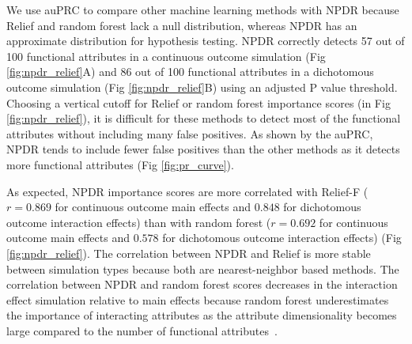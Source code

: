 \documentclass[10pt]{article}
\begin{document}
We use auPRC to compare other machine learning methods with NPDR because Relief and random forest lack a null distribution, whereas NPDR has an approximate distribution for hypothesis testing. NPDR correctly detects 57 out of 100 functional attributes in a continuous outcome simulation (Fig \ref{fig:npdr_relief}A) and 86 out of 100 functional attributes in a dichotomous outcome simulation (Fig \ref{fig:npdr_relief}B) using an adjusted P value threshold. Choosing a vertical cutoff for Relief or random forest importance scores (in Fig \ref{fig:npdr_relief}), it is difficult for these methods to detect most of the functional attributes without including many false positives. As shown by the auPRC, NPDR tends to include fewer false positives than the other methods as it detects more functional attributes (Fig \ref{fig:pr_curve}).

As expected, NPDR importance scores are more correlated with Relief-F ($r = 0.869$ for continuous outcome main effects and $0.848$ for dichotomous outcome interaction effects) than with random forest ($r = 0.692$ for continuous outcome main effects and $0.578$ for dichotomous outcome interaction effects) (Fig \ref{fig:npdr_relief}). The correlation between NPDR and Relief is more stable between simulation types because both are nearest-neighbor based methods. The correlation between NPDR and random forest scores decreases in the interaction effect simulation relative to main effects because random forest underestimates the importance of interacting attributes as the attribute dimensionality becomes large compared to the number of functional attributes~\cite{mckinney2009capturing,winham2012snp}.
\end{document}
